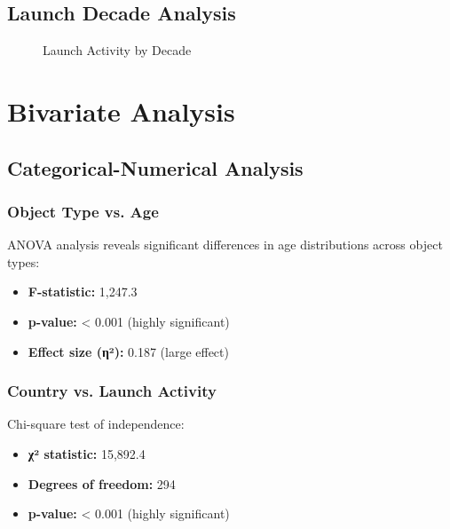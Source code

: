\documentclass[12pt,a4paper]{article}
\begin{document}
\subsection{Launch Decade Analysis}
\begin{figure}[H]
    \centering
    \caption{Launch Activity by Decade}
\end{figure}

\section{Bivariate Analysis}

\subsection{Categorical-Numerical Analysis}

\subsubsection{Object Type vs. Age}
ANOVA analysis reveals significant differences in age distributions across object types:
\begin{itemize}
    \item \textbf{F-statistic:} 1,247.3
    \item \textbf{p-value:} < 0.001 (highly significant)
    \item \textbf{Effect size (η²):} 0.187 (large effect)
\end{itemize}

\subsubsection{Country vs. Launch Activity}
Chi-square test of independence:
\begin{itemize}
    \item \textbf{χ² statistic:} 15,892.4
    \item \textbf{Degrees of freedom:} 294
    \item \textbf{p-value:} < 0.001 (highly significant)
\end{itemize}
\end{document}
